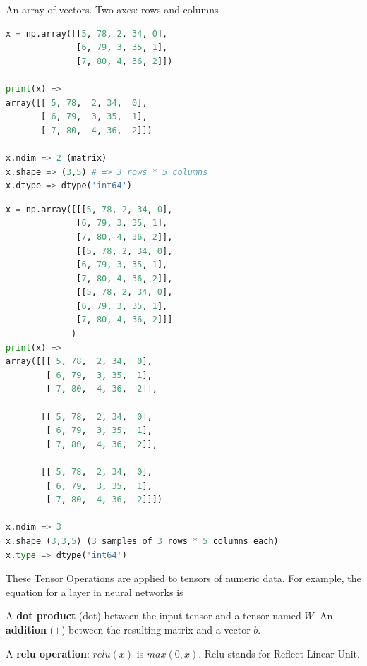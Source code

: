 {

An array of vectors. Two axes: rows and columns

\vs
\begin{lstlisting}[language=python, breaklines=true]
x = np.array([[5, 78, 2, 34, 0],
              [6, 79, 3, 35, 1],
              [7, 80, 4, 36, 2]])

print(x) => 
array([[ 5, 78,  2, 34,  0],
       [ 6, 79,  3, 35,  1],
       [ 7, 80,  4, 36,  2]])

x.ndim => 2 (matrix)
x.shape => (3,5) # => 3 rows * 5 columns
x.dtype => dtype('int64')
\end{lstlisting}
\vs



\begin{lstlisting}[language=python, breaklines=true]
x = np.array([[[5, 78, 2, 34, 0],
              [6, 79, 3, 35, 1],
              [7, 80, 4, 36, 2]],
              [[5, 78, 2, 34, 0],
              [6, 79, 3, 35, 1],
              [7, 80, 4, 36, 2]],
              [[5, 78, 2, 34, 0],
              [6, 79, 3, 35, 1],
              [7, 80, 4, 36, 2]]]
             )
print(x) =>
array([[[ 5, 78,  2, 34,  0],
        [ 6, 79,  3, 35,  1],
        [ 7, 80,  4, 36,  2]],

       [[ 5, 78,  2, 34,  0],
        [ 6, 79,  3, 35,  1],
        [ 7, 80,  4, 36,  2]],

       [[ 5, 78,  2, 34,  0],
        [ 6, 79,  3, 35,  1],
        [ 7, 80,  4, 36,  2]]])

x.ndim => 3
x.shape (3,3,5) (3 samples of 3 rows * 5 columns each)
x.type => dtype('int64')
\end{lstlisting}
\vs


These Tensor Operations are applied to tensors of numeric data. For example, the equation for a layer in neural networks is


A \textbf{dot product} (dot) between the input tensor and a tensor named $W$. An \textbf{addition} ($+$) between the resulting matrix and a vector $b$.

A \textbf{relu operation}: $relu(x)$ is $max(0,x)$. Relu stands for Reflect Linear Unit.


}

